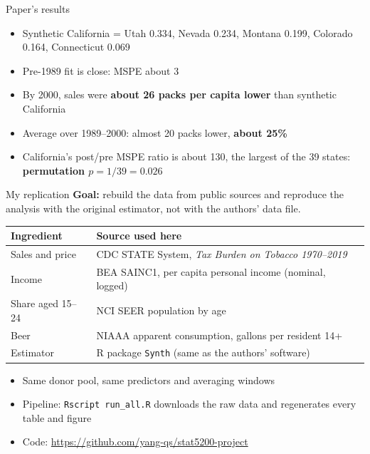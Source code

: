 \documentclass[10pt,aspectratio=169]{beamer}
\begin{document}
\begin{frame}{Paper's results}
\begin{itemize}
\item Synthetic California = Utah 0.334, Nevada 0.234, Montana 0.199,
Colorado 0.164, Connecticut 0.069
\item Pre-1989 fit is close: MSPE about 3
\item By 2000, sales were \textbf{about 26 packs per capita lower} than
synthetic California
\item Average over 1989--2000: almost 20 packs lower, \textbf{about 25\%}
\item California's post/pre MSPE ratio is about 130, the largest of the 39
states: \textbf{permutation $p = 1/39 = 0.026$}
\end{itemize}
\end{frame}

\begin{frame}{My replication}
\textbf{Goal:} rebuild the data from public sources and reproduce the
analysis with the original estimator, not with the authors' data file.

\medskip
\begin{tabular}{@{}ll@{}}
\toprule
Ingredient & Source used here \\
\midrule
Sales and price & CDC STATE System, \emph{Tax Burden on Tobacco 1970--2019} \\
Income & BEA SAINC1, per capita personal income (nominal, logged) \\
Share aged 15--24 & NCI SEER population by age \\
Beer & NIAAA apparent consumption, gallons per resident 14+ \\
Estimator & R package \texttt{Synth} (same as the authors' software) \\
\bottomrule
\end{tabular}

\medskip
\begin{itemize}
\item Same donor pool, same predictors and averaging windows
\item Pipeline: \texttt{Rscript run\_all.R} downloads the raw data and
regenerates every table and figure
\item Code: \url{https://github.com/yang-qs/stat5200-project}
\end{itemize}
\end{frame}
\end{document}
